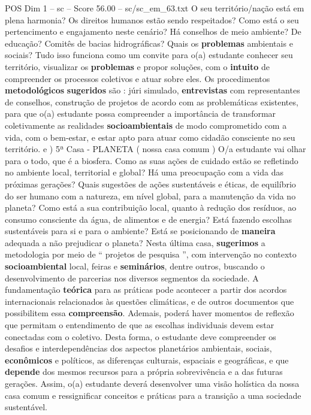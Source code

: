 \begin{textsample}{POS Dim 1 – sc – Score 56.00 – sc/sc\_em\_63.txt}
O seu território/nação está em plena harmonia?
Os direitos humanos estão sendo respeitados?
Como está o seu pertencimento e engajamento neste cenário?
Há conselhos de meio ambiente?
De educação?
Comitês de bacias hidrográficas?
Quais os \textbf{problemas} ambientais e sociais?
Tudo isso funciona como um convite para o(a) estudante conhecer seu território, visualizar os \textbf{problemas} e propor soluções, com o \textbf{intuito} de compreender os processos coletivos e atuar sobre eles.
Os procedimentos \textbf{metodológicos} \textbf{sugeridos} são : júri simulado, \textbf{entrevistas} com representantes de conselhos, construção de projetos de acordo com as problemáticas existentes, para que o(a) estudante possa compreender a importância de transformar coletivamente as realidades \textbf{socioambientais} de modo comprometido com a vida, com o bem-estar, e estar apto para atuar como cidadão consciente no seu território. e ) 5ª Casa - PLANETA ( nossa casa comum ) O/a estudante vai olhar para o todo, que é a biosfera.
Como as suas ações de cuidado estão se refletindo no ambiente local, territorial e global?
Há uma preocupação com a vida das próximas gerações?
Quais sugestões de ações sustentáveis e éticas, de equilíbrio do ser humano com a natureza, em nível global, para a manutenção da vida no planeta?
Como está a sua contribuição local, quanto à redução dos resíduos, ao consumo consciente da água, de alimentos e de energia?
Está fazendo escolhas sustentáveis para si e para o ambiente?
Está se posicionando de \textbf{maneira} adequada a não prejudicar o planeta?
Nesta última casa, \textbf{sugerimos} a metodologia por meio de “ projetos de pesquisa ”, com intervenção no contexto \textbf{socioambiental} local, feiras e \textbf{seminários}, dentre outros, buscando o desenvolvimento de parcerias nos diversos segmentos da sociedade.
A fundamentação \textbf{teórica} para as práticas pode acontecer a partir dos acordos internacionais relacionados às questões climáticas, e de outros documentos que possibilitem essa \textbf{compreensão}.
Ademais, poderá haver momentos de reflexão que permitam o entendimento de que as escolhas individuais devem estar conectadas com o coletivo.
Desta forma, o estudante deve compreender os desafios e interdependências dos aspectos planetários ambientais, sociais, \textbf{econômicos} e políticos, as diferenças culturais, espaciais e geográficas, e que \textbf{depende} dos mesmos recursos para a própria sobrevivência e a das futuras gerações.
Assim, o(a) estudante deverá desenvolver uma visão holística da nossa casa comum e ressignificar conceitos e práticas para a transição a uma sociedade sustentável.

\end{textsample}
